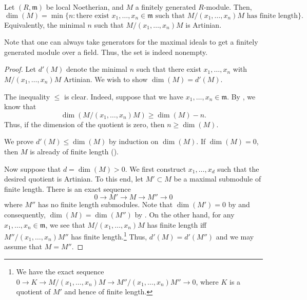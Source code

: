 \documentclass[12pt]{article}
\begin{document}
\begin{thm}
	Let $(R, \mathfrak{m})$ be local Noetherian, and $M$ a finitely generated $R$-module. Then,
	\begin{equation*} 
		\dim(M) = \min\{n : \text{there exist $x_{1}, \ldots, x_{n} \in \mathfrak{m}$ such that $M/(x_{1}, \ldots, x_{n})M$ has finite length}\}.
	\end{equation*}
	Equivalently, the minimal $n$ such that $M/(x_{1}, \ldots, x_{n})M$ is Artinian.
\end{thm}
Note that one can always take generators for the maximal ideals to get a finitely generated module over a field. Thus, the set is indeed nonempty.
\begin{proof} 
	Let $d'(M)$ denote the minimal $n$ such that there exist $x_{1}, \ldots, x_{n}$ with $M/(x_{1}, \ldots, x_{n})M$ Artinian. We wish to show $\dim(M) = d'(M)$.

	The inequality $\le$ is clear. Indeed, suppose that we have $x_{1}, \ldots, x_{n} \in \mathfrak{m}$. By , we know that
	\begin{equation*} 
		\dim(M/(x_{1}, \ldots, x_{n}) M) \ge \dim(M) - n.
	\end{equation*}
	Thus, if the dimension of the quotient is zero, then $n \ge \dim(M)$.

	We prove $d'(M) \le \dim(M)$ by induction on $\dim(M)$. If $\dim(M) = 0$, then $M$ is already of finite length ().

	Now suppose that $d = \dim(M) > 0$. We first construct $x_{1}, \ldots, x_{d}$ such that the desired quotient is Artinian. \newline
	To this end, let $M' \subset M$ be a maximal submodule of finite length. There is an exact sequence
	\begin{equation*} 
		0 \to M' \to M \to M'' \to 0
	\end{equation*}
	where $M''$ has no finite length submodules. Note that $\dim(M') = 0$ by  and consequently, $\dim(M) = \dim(M'')$ by . \newline
	On the other hand, for any $x_{1}, \ldots, x_{n} \in \mathfrak{m}$, we see that $M/(x_{1}, \ldots, x_{n})M$ has finite length iff $M''/(x_{1}, \ldots, x_{n})M''$ has finite length.\footnote{We have the exact sequence $0 \to K \to M/(x_{1}, \ldots, x_{n})M \to M''/(x_{1}, \ldots, x_{n})M'' \to 0$, where $K$ is a quotient of $M'$ and hence of finite length.} Thus, $d'(M) = d'(M'')$ and we may assume that $M = M''$.


\end{proof}
\end{document}
